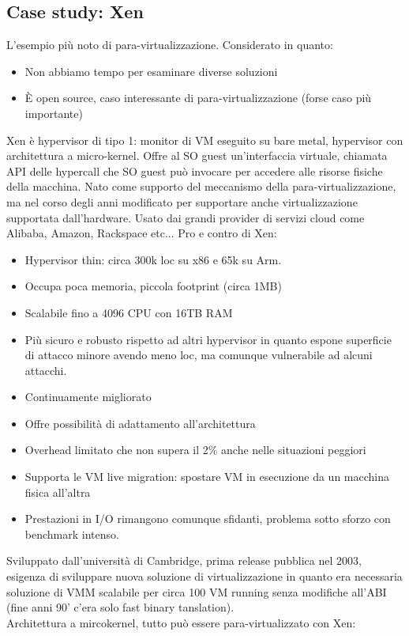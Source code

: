 \documentclass{article}
\begin{document}
\subsection{Case study: Xen}
L'esempio più noto di para-virtualizzazione. Considerato in quanto:
\begin{itemize}
\item Non abbiamo tempo per esaminare diverse soluzioni
\item È open source, caso interessante di para-virtualizzazione (forse caso più importante)
\end{itemize}
Xen è hypervisor di tipo 1: monitor di VM eseguito su bare metal, hypervisor con architettura a micro-kernel. Offre al SO guest un'interfaccia virtuale, chiamata API delle hypercall che SO guest può invocare per accedere alle risorse fisiche della macchina. Nato come supporto del meccanismo della para-virtualizzazione, ma nel corso degli anni modificato per supportare anche virtualizzazione supportata dall'hardware. Usato dai grandi provider di servizi cloud come Alibaba, Amazon, Rackspace etc...
Pro e contro di Xen:
\begin{itemize}
\item Hypervisor thin: circa 300k loc su x86 e 65k su Arm.
\item Occupa poca memoria, piccola footprint (circa 1MB)
\item Scalabile fino a 4096 CPU con 16TB RAM
\item Più sicuro e robusto rispetto ad altri hypervisor in quanto espone superficie di attacco minore avendo meno loc, ma comunque vulnerabile ad alcuni attacchi.
\item Continuamente migliorato
\item Offre possibilità di adattamento all'architettura
\item Overhead limitato che non supera il 2\% anche nelle situazioni peggiori
\item Supporta le VM live migration: spostare VM in esecuzione da un macchina fisica all'altra
\item Prestazioni in I/O rimangono comunque sfidanti, problema sotto sforzo con benchmark intenso.
\end{itemize}
Sviluppato dall'università di Cambridge, prima release pubblica nel 2003, esigenza di sviluppare nuova soluzione di virtualizzazione in quanto era necessaria soluzione di VMM scalabile per circa 100 VM running senza modifiche all'ABI (fine anni 90' c'era solo fast binary tanslation).\\ Architettura a mircokernel, tutto può essere para-virtualizzato con Xen:
\end{document}
